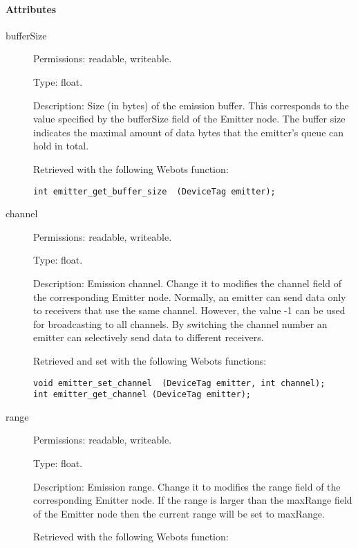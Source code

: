 \paragraph{Attributes}
\label{webots.uobjects.robotdevices.emitter.attributes}%

\noindent
\begin{description}
\item[{         bufferSize
  }]            Permissions: readable, writeable.


  Type: float.


  Description: Size (in bytes) of the emission buffer. This
  corresponds to the value specified by the bufferSize field of the
  Emitter node. The buffer size indicates the maximal amount of data
  bytes that the emitter's queue can hold in total.


  Retrieved with the following Webots function:


\begin{lstlisting}[firstnumber=1,]
int emitter_get_buffer_size  (DeviceTag emitter);
\end{lstlisting}
\item[{         channel
  }]            Permissions: readable, writeable.


  Type: float.


  Description: Emission channel. Change it to modifies the channel
  field of the corresponding Emitter node. Normally, an emitter can
  send data only to receivers that use the same channel. However, the
  value -{}1 can be used for broadcasting to all channels. By
  switching the channel number an emitter can selectively send data to
  different receivers.


  Retrieved and set with the following Webots functions:


\begin{lstlisting}[firstnumber=1,]
void emitter_set_channel  (DeviceTag emitter, int channel);
int emitter_get_channel (DeviceTag emitter);
\end{lstlisting}
\item[{         range
 }]            Permissions: readable, writeable.


 Type: float.


 Description: Emission range. Change it to modifies the range field of
 the corresponding Emitter node. If the range is larger than the
 maxRange field of the Emitter node then the current range will be set
 to maxRange.


          Retrieved with the following Webots function:



\end{description}
